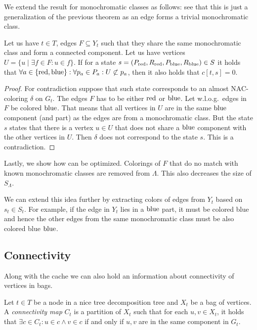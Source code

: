 We extend the result for monochromatic classes as follows:
see that this is just a generalization of the previous theorem
as an edge forms a trivial monochromatic class.
%
\begin{lemma}
	Let us have \( t \in T \),
	edges \( F \subseteq Y_t \) such that
	they share the same monochromatic class and form a connected component.
	Let us have vertices \( U = \{ u \mid \exists f \in F : u \in f \} \).
	If for a state \( s = (P_{\text{red}}, R_{\text{red}}, P_{\text{blue}}, R_{\text{blue}}) \in S \)
	it holds that
	\( {\forall a \in \{\text{red}, \text{blue}\} }:{ \forall p_a \in P_a }:{ U \not\subset p_a} \),
	then it also holds that \( c[t, s] = 0 \).
\end{lemma}
%
\begin{proof}
	For contradiction suppose that such state corresponds
	to an almost NAC-coloring \( \delta \) on \( G_t \).
	The edges \( F \) has to be either \( \text{red} \) or \( \text{blue} \).
	Let w.l.o.g.\ edges in \( F \) be colored \( \text{blue} \).
	That means that all vertices in \( U \) are in the same \( \text{blue} \) component (and part)
	as the edges are from a monochromatic class.
	But the state \( s \) states that there is a vertex \( u \in U \)
	that does not share a \( \text{blue} \) component with the other vertices in \( U \).
	Then \( \delta \) does not correspond to the state \( s \).
	This is a contradiction.
\end{proof}
%

Lastly, we show how \IntroduceVertexWithEdgesNode{} can be optimized.
Colorings of \( F \) that do no match with known monochromatic classes
are removed from \( \Lambda \). This also decreases the size of \( S_\Lambda \).

We can extend this idea further by extracting colors of edges from \( Y_{t} \)
based on \( s_t \in S_t \).
For example, if the edge in \( Y_{t} \) lies in a \( \text{blue} \) part,
it must be colored blue and hence
the other edges from the same monochromatic class
must be also colored blue \( \text{blue} \).


\subsection{Connectivity}

Along with the cache we can also hold an information about connectivity of
vertices in bags.
%
\begin{definition}
	Let \( t \in T \) be a node in a nice tree decomposition tree and
	\( X_t \) be a bag of vertices.
	A \emph{connectivity map} \( C_t \) is a partition of \( X_t \) such that
	for each \( u, v \in X_t \), it holds that
	\( \exists c \in C_t : u \in c \land v \in c \) if and only if
	\( u, v \) are in the same component in \( G_t \).
\end{definition}
%

